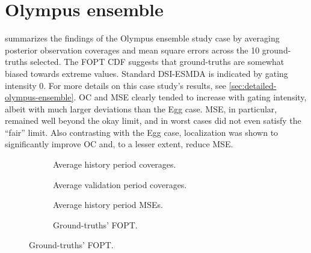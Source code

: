 \section{Olympus ensemble}
\label{sec:results-olympus}

 summarizes the findings of the Olympus ensemble study case 
by averaging posterior observation coverages and mean square errors across the 10 ground-truths selected.
The FOPT CDF suggests that ground-truths are somewhat biased towards extreme values.
Standard DSI-ESMDA is indicated by gating intensity 0.
For more details on this case study's results, see
\cref{sec:detailed-olympus-ensemble}.
%
OC and MSE clearly tended to increase with gating intensity,
albeit with much larger deviations than the Egg case. 
MSE, in particular, remained well beyond the okay limit, 
and in worst cases did not even satisfy the ``fair'' limit.
%
Also contrasting with the Egg case, localization was shown to significantly 
improve OC and, to a lesser extent, reduce MSE.

\begin{figure}[htbp]
    \caption{%
        Summary of results for the Olympus ensemble.
        Posterior coverage and MSE are averaged across ground-truths.
    }
    \label{fig:olympus-summaries}
    \begin{subfigure}{.49\linewidth}
        \centering
        \caption{Average history period coverages.}
        
    \end{subfigure}
    \begin{subfigure}{.49\linewidth}
        \centering
        \caption{Average validation period coverages.}
        
    \end{subfigure}
    \begin{subfigure}{.49\linewidth}
        \centering
        \caption{Average history period MSEs.}
        
    \end{subfigure}
    \begin{subfigure}{.49\linewidth}
        \centering
        \caption{
            Ground-truths' FOPT.
        }
        \label{fig:fopt-olympus} 
        
    \end{subfigure}
\end{figure}
